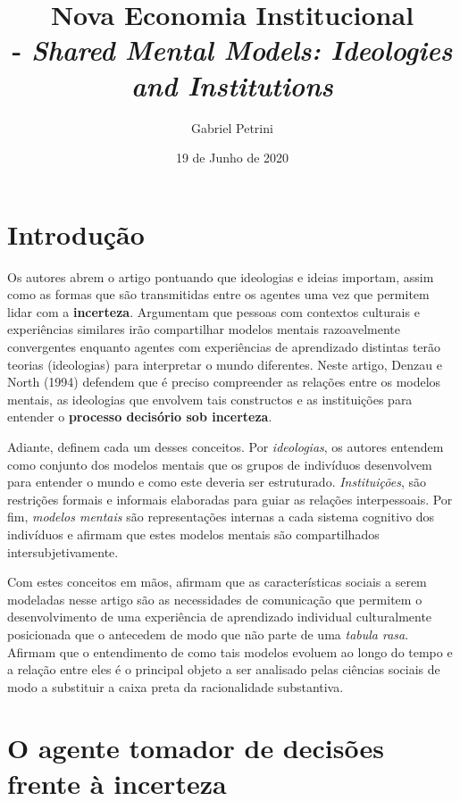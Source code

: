 \documentclass[11pt,lineno]{../style}
\title{
\large{Nova Economia Institucional}\vspace{2pt}\\
\Huge{\autor - \textit{Shared Mental Models: Ideologies and Institutions}}
}
\date{19 de Junho de 2020}
\author[$\ast$]{Gabriel Petrini}
\affil[$\ast$]{PhD Student at Unicamp.}
\newcommand{\autor}{Denzau e North (1994) }
\begin{document}
\maketitle
\marginmark
\thispagestyle{firststyle}

\section{Introdução}

Os autores abrem o artigo pontuando que ideologias e ideias importam, assim como as formas que são transmitidas entre os agentes uma vez que permitem lidar com a \textbf{incerteza}. Argumentam que pessoas com contextos culturais e experiências similares irão compartilhar modelos mentais razoavelmente convergentes enquanto agentes com experiências de aprendizado distintas terão teorias (ideologias) para interpretar o mundo diferentes. Neste artigo, \autor defendem que é preciso compreender as relações entre os modelos mentais, as ideologias que envolvem tais constructos e as instituições para entender o \textbf{processo decisório sob incerteza}. 

Adiante, definem cada um desses conceitos. Por \textit{ideologias}, os autores entendem como conjunto dos modelos mentais que os grupos de indivíduos desenvolvem para entender o mundo e como este deveria ser estruturado. \textit{Instituições}, são restrições formais e informais elaboradas para guiar as relações interpessoais. Por fim, \textit{modelos mentais} são representações internas a cada sistema cognitivo dos indivíduos e afirmam que estes modelos mentais são compartilhados intersubjetivamente.

Com estes conceitos em mãos, afirmam que as características sociais a serem modeladas nesse artigo são as necessidades de comunicação que permitem o desenvolvimento de uma experiência de aprendizado individual culturalmente posicionada que o antecedem de modo que não parte de uma \textit{tabula rasa}. Afirmam que o entendimento de como tais modelos evoluem ao longo do tempo e a relação entre eles é o principal objeto a ser analisado pelas ciências sociais de modo a substituir a caixa preta da racionalidade substantiva.

\section{O agente tomador de decisões frente à incerteza}
\end{document}
